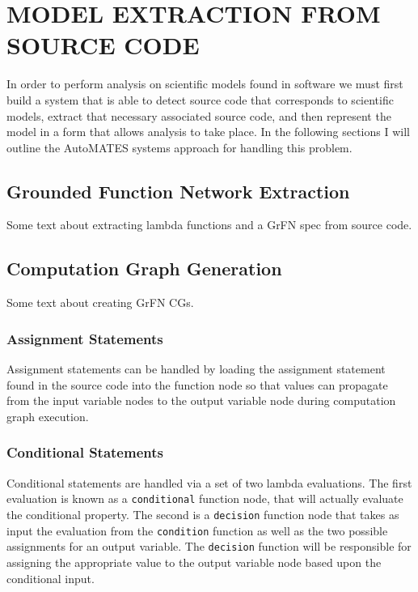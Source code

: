 \chapter{MODEL EXTRACTION FROM SOURCE CODE\label{chapter:extraction}}

In order to perform analysis on scientific models found in software we must first build a system that is able to detect source code that corresponds to scientific models, extract that necessary associated source code, and then represent the model in a form that allows analysis to take place. In the following sections I will outline the AutoMATES systems approach for handling this problem.

\section{Grounded Function Network Extraction\label{sec:grfn_extract}}

Some text about extracting lambda functions and a GrFN spec from source code.

\section{Computation Graph Generation\label{sec:cg_gen}}

Some text about creating GrFN CGs.

\subsection{Assignment Statements\label{sec:assg_stmts}}
Assignment statements can be handled by loading the assignment statement found in the source code into the function node so that values can propagate from the input variable nodes to the output variable node during computation graph execution.

\subsection{Conditional Statements\label{sec:cond_stmts}}
Conditional statements are handled via a set of two lambda evaluations. The first evaluation is known as a \texttt{conditional} function node, that will actually evaluate the conditional property. The second is a \texttt{decision} function node that takes as input the evaluation from the \texttt{condition} function as well as the two possible assignments for an output variable. The \texttt{decision} function will be responsible for assigning the appropriate value to the output variable node based upon the conditional input.

